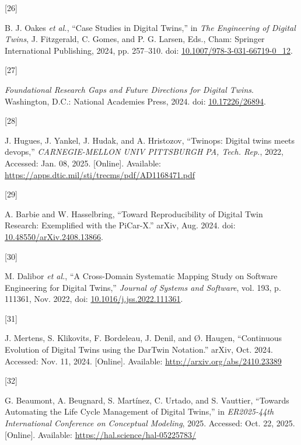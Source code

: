 \documentclass[
  12pt,
  a4paper,
]{article}
\newlength{\cslhangindent}
\newlength{\csllabelwidth}
\newenvironment{CSLReferences}[2] %
 {\begin{list}{}{%
  \setlength{\itemindent}{0pt}
  \setlength{\leftmargin}{0pt}
  \setlength{\parsep}{0pt}
  \ifodd #1
   \setlength{\leftmargin}{\cslhangindent}
   \setlength{\itemindent}{-1\cslhangindent}
  \fi
  \setlength{\itemsep}{#2\baselineskip}}}
 {\end{list}}
\newcommand{\CSLLeftMargin}[1]{\parbox[t]{\csllabelwidth}{\strut#1\strut}}
\newcommand{\CSLRightInline}[1]{\parbox[t]{\linewidth - \csllabelwidth}{\strut#1\strut}}
\begin{document}
\begin{CSLReferences}{0}{0}
\CSLLeftMargin{{[}26{]} }%
\CSLRightInline{B. J. Oakes \emph{et al.}, {``Case {Studies} in
{Digital} {Twins},''} in \emph{The {Engineering} of {Digital} {Twins}},
J. Fitzgerald, C. Gomes, and P. G. Larsen, Eds., Cham: Springer
International Publishing, 2024, pp. 257--310. doi:
\href{https://doi.org/10.1007/978-3-031-66719-0_12}{10.1007/978-3-031-66719-0\_12}.}

\CSLLeftMargin{{[}27{]} }%
\CSLRightInline{\emph{Foundational {Research} {Gaps} and {Future}
{Directions} for {Digital} {Twins}}. Washington, D.C.: National
Academies Press, 2024. doi:
\href{https://doi.org/10.17226/26894}{10.17226/26894}.}

\CSLLeftMargin{{[}28{]} }%
\CSLRightInline{J. Hugues, J. Yankel, J. Hudak, and A. Hristozov,
{``Twinops: {Digital} twins meets devops,''} \emph{CARNEGIE-MELLON UNIV
PITTSBURGH PA, Tech. Rep.}, 2022, Accessed: Jan. 08, 2025. {[}Online{]}.
Available: \url{https://apps.dtic.mil/sti/trecms/pdf/AD1168471.pdf}}

\CSLLeftMargin{{[}29{]} }%
\CSLRightInline{A. Barbie and W. Hasselbring, {``Toward
{Reproducibility} of {Digital} {Twin} {Research}: {Exemplified} with the
{PiCar}-{X}.''} arXiv, Aug. 2024. doi:
\href{https://doi.org/10.48550/arXiv.2408.13866}{10.48550/arXiv.2408.13866}.}

\CSLLeftMargin{{[}30{]} }%
\CSLRightInline{M. Dalibor \emph{et al.}, {``A {Cross}-{Domain}
{Systematic} {Mapping} {Study} on {Software} {Engineering} for {Digital}
{Twins},''} \emph{Journal of Systems and Software}, vol. 193, p. 111361,
Nov. 2022, doi:
\href{https://doi.org/10.1016/j.jss.2022.111361}{10.1016/j.jss.2022.111361}.}

\CSLLeftMargin{{[}31{]} }%
\CSLRightInline{J. Mertens, S. Klikovits, F. Bordeleau, J. Denil, and Ø.
Haugen, {``Continuous {Evolution} of {Digital} {Twins} using the
{DarTwin} {Notation}.''} arXiv, Oct. 2024. Accessed: Nov. 11, 2024.
{[}Online{]}. Available: \url{http://arxiv.org/abs/2410.23389}}

\CSLLeftMargin{{[}32{]} }%
\CSLRightInline{G. Beaumont, A. Beugnard, S. Martínez, C. Urtado, and S.
Vauttier, {``Towards {Automating} the {Life} {Cycle} {Management} of
{Digital} {Twins},''} in \emph{{ER2025}-44th {International}
{Conference} on {Conceptual} {Modeling}}, 2025. Accessed: Oct. 22, 2025.
{[}Online{]}. Available: \url{https://hal.science/hal-05225783/}}


\end{CSLReferences}
\end{document}

